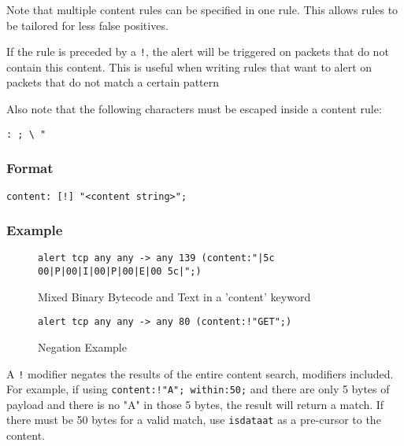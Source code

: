 \documentclass[english]{report}
\newenvironment{note}{
\samepage
    \vspace{10pt}{\textsf{
        {\hspace{7pt}\Huge{$\triangle$\hspace{-12.5pt}{\Large{$^!$}}}}\hspace{5pt}
        {\Large{NOTE}}
    }
    }
   \begin{center}
    \par\vspace{-17pt}

    \begin{lrbox}{\savepar}
    \begin{minipage}[r]{6in}
}
{
    \end{minipage}
    \end{lrbox}
    \fbox{
        \usebox{
            \savepar
	}
    }
    \par\vskip10pt
    \end{center}
}
\begin{document}
Note that multiple content rules can be specified in one rule. This
allows rules to be tailored for less false positives. 

If the rule is preceded by a \texttt{!}, the alert will be triggered
on packets that do not contain this content. This is useful when writing
rules that want to alert on packets that do not match a certain pattern

\begin{note}
Also note that the following characters must be escaped inside a content
rule:

\begin{verbatim}
: ; \ "
\end{verbatim}
\end{note}


\subsubsection{Format}

\begin{verbatim}
content: [!] "<content string>";
\end{verbatim}


\subsubsection{Example}

\begin{figure}[!hbpt]
\begin{verbatim}
alert tcp any any -> any 139 (content:"|5c 00|P|00|I|00|P|00|E|00 5c|";)
\end{verbatim}
\caption{\label{mixed content example}Mixed Binary Bytecode and Text in a 'content' keyword}
\end{figure}

\begin{figure}[!hbpt]
\begin{verbatim}
alert tcp any any -> any 80 (content:!"GET";)
\end{verbatim}
\caption{\label{content negation example}Negation Example}
\end{figure}

\begin{note}
A \texttt{!} modifier negates the results of the entire content search,
modifiers included.  For example, if using \texttt{content:!"A"; within:50;}
and there are only 5 bytes of payload and there is no "A" in those 5 bytes,
the result will return a match.  If there must be 50 bytes for a valid
match, use \texttt{isdataat} as a pre-cursor to the content.
\end{note}
\end{document}
